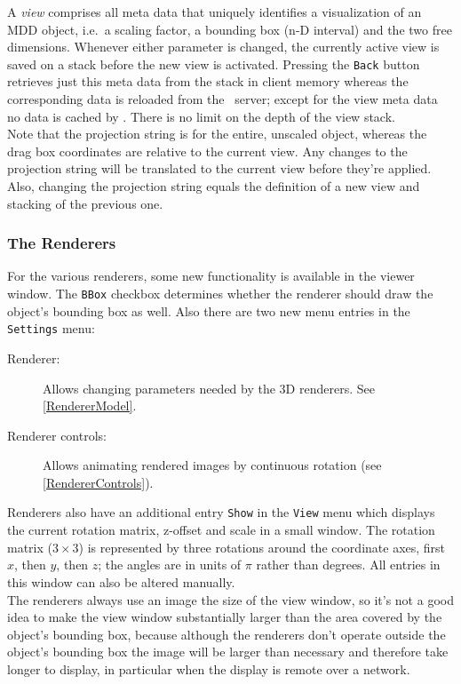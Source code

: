 \documentclass[11pt]{article}
\begin{document}
A \emph{view} comprises all meta data that uniquely identifies a visualization
of an MDD object, i.e.\ a scaling factor, a bounding box (n-D interval) and
the two free dimensions. Whenever either parameter is changed, the currently
active view is saved on a stack before the new view is activated. Pressing the
\texttt{Back} button retrieves just this meta data from the stack in client memory
whereas the corresponding data is reloaded from the \rman\ server; except for
the view meta data no data is cached by \rview. There is no limit on the depth
of the view stack.\\
Note that the projection string is for the entire, unscaled object, whereas the
drag box coordinates are relative to the current view. Any changes to the projection
string  will be translated to the current view before they're applied. Also,
changing the projection string equals the definition of a new view and
stacking of the previous one.


\subsubsection{The Renderers}
\label{Renderers}

For the various renderers, some new functionality is available in the viewer
window. The \texttt{BBox} checkbox determines whether the renderer should draw the object's
bounding box as well. Also there are two new menu entries in the \texttt{Settings}
menu:

\begin{description}
\item[Renderer:] Allows changing parameters needed by the 3D renderers. See
\ref{RendererModel}.
\item[Renderer controls:] Allows animating rendered images by continuous
rotation (see \ref{RendererControls}).

\end{description}       %

Renderers also have an additional entry \texttt{Show} in the \texttt{View} menu
which displays the current rotation matrix, z-offset and scale in a small window.
The rotation matrix ($3\times 3$) is represented by three rotations around the
coordinate axes, first $x$, then $y$, then $z$; the angles are in units of $\pi$
rather than degrees. All entries in this window can also be altered manually.\\
The renderers always use an image the size of the view window, so it's not a good
idea to make the view window substantially larger than the area covered by the
object's bounding box, because although the renderers don't operate outside the
object's bounding box the image will be larger than necessary and therefore take
longer to display, in particular when the display is remote over a network.
\end{document}

